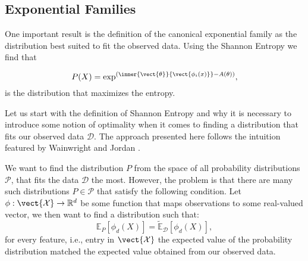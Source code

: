     \subsection{Exponential Families}
    \label{ssec:expf}
    One important result is the definition of the canonical exponential family as the distribution best suited to fit the observed data.
    Using the Shannon Entropy we find that

    \begin{equation}
        P(X) = \exp^{(\inner{\vect{\theta}}{\vect{\phi_i(x)}} - A(\theta))},
    \end{equation}
    is the distribution that maximizes the entropy.

    Let us start with the definition of Shannon Entropy and why it is necessary to introduce some notion of optimality when it comes to finding a distribution that fits our observed data $\mathcal{D}$.
    The approach presented here follows the intuition featured by Wainwright and Jordan \cite{wainwright2008graphical}.

    We want to find the distribution $P$ from the space of all probability distributions $\mathcal{P}$, that fits the data  $\mathcal{D}$ the most.
    However, the problem is that there are many such distributions $P \in \mathcal{P}$ that satisfy the following condition. Let $\phi: \vect{\mathcal{X}}  \rightarrow \mathbb{R}^d$ be some function that maps observations to some real-valued vector, we then want to find a distribution such that:
    \begin{equation}
        \label{eq:expecval}
        \mathbb{E}_P[\phi_d(X)] = \tilde{\mathbb{E}}_{\mathcal{D}}[\phi_d(X)], 
    \end{equation}
    for every feature, i.e., entry in $\vect{\mathcal{X}}$ the expected value of the probability distribution matched the expected value obtained from our observed data.

